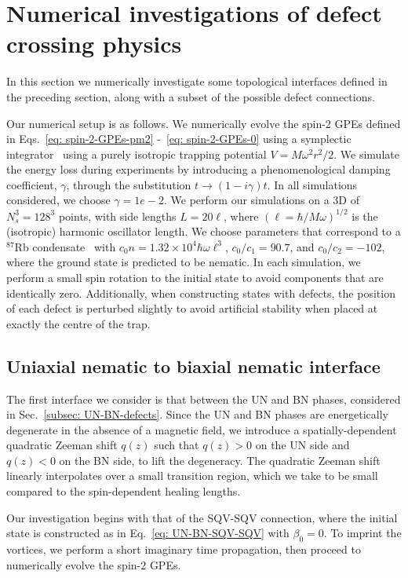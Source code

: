 \section{Numerical investigations of defect crossing physics}
In this section we numerically investigate some topological interfaces defined
in the preceding section, along with a subset of the possible defect
connections.

Our numerical setup is as follows.
We numerically evolve the spin-2 GPEs defined in
Eqs.~\eqref{eq: spin-2-GPEs-pm2} -~\eqref{eq: spin-2-GPEs-0} using a symplectic
integrator~\cite{SymesNumeric2017} using a purely isotropic trapping potential
\(V=M\omega^2r^2/2\).
We simulate the energy loss during experiments by introducing a phenomenological
damping coefficient, \(\gamma \), through the substitution
\(t \rightarrow (1-i\gamma)t\).
In all simulations considered, we choose \(\gamma = 1e-2\).
We perform our simulations on a 3D of \(N_s^3=128^3\) points, with side lengths
\(L = 20\ell \), where \({(\ell =\hbar/M\omega)}^{1/2}\) is the (isotropic)
harmonic oscillator length.
We choose parameters that correspond to a \(^{87}\)Rb
condensate~\cite{Klausen2001} with \(c_0n=1.32\times10^4\hbar\omega\ell^3\),
\(c_0/c_1=90.7\), and \(c_0/c_2=-102\), where the ground state is predicted to
be nematic.
In each simulation, we perform a small spin rotation to the initial state to
avoid components that are identically zero.
Additionally, when constructing states with defects, the position of each defect
is perturbed slightly to avoid artificial stability when placed at exactly the
centre of the trap.


\subsection{Uniaxial nematic to biaxial nematic interface}
The first interface we consider is that between the UN and BN phases, considered
in Sec.~\ref{subsec: UN-BN-defects}.
Since the UN and BN phases are energetically degenerate in the absence of a
magnetic field, we introduce a spatially-dependent quadratic Zeeman shift
\(q(z)\) such that \(q(z) > 0\) on the UN side and \(q(z) < 0\) on the BN side,
to lift the degeneracy.
The quadratic Zeeman shift linearly interpolates over a small transition region,
which we take to be small compared to the spin-dependent healing lengths.

Our investigation begins with that of the SQV-SQV connection, where the initial
state is constructed as in Eq.~\eqref{eq: UN-BN-SQV-SQV} with \(\beta_0=0\).
To imprint the vortices, we perform a short imaginary time propagation, then
proceed to numerically evolve the spin-2 GPEs.


